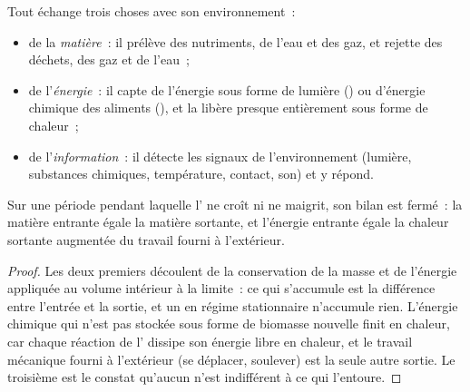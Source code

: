 \begin{proposition}\label{prop:b1:organism-environment:exchanges}
Tout  échange trois choses avec son environnement~:
\begin{itemize}
  \item de la \emph{matière}~: il prélève des
        nutriments, de l'eau et des gaz, et rejette des déchets, des gaz
        et de l'eau~;
  \item de l'\emph{énergie}~: il capte de
        l'énergie sous forme de lumière () ou d'énergie
        chimique des aliments (), et la libère presque
        entièrement sous forme de chaleur~;
  \item de l'\emph{information}~: il détecte
        les signaux de l'environnement (lumière, substances chimiques,
        température, contact, son) et y répond.
\end{itemize}
Sur une période pendant laquelle l' ne croît ni ne maigrit, son
bilan est fermé~: la matière entrante égale la matière sortante, et
l'énergie entrante égale la chaleur sortante augmentée du travail fourni
à l'extérieur.
\end{proposition}
\begin{proof}
Les deux premiers découlent de la conservation de la masse et de
l'énergie appliquée au volume intérieur à la limite~: ce qui s'accumule
est la différence entre l'entrée et la sortie, et un  en régime
stationnaire n'accumule rien. L'énergie chimique qui n'est pas stockée
sous forme de biomasse nouvelle finit en chaleur, car chaque réaction de
l' dissipe son énergie libre en chaleur, et le travail mécanique
fourni à l'extérieur (se déplacer, soulever) est la seule autre sortie.
Le troisième est le constat qu'aucun  n'est indifférent à ce qui
l'entoure.
\end{proof}

